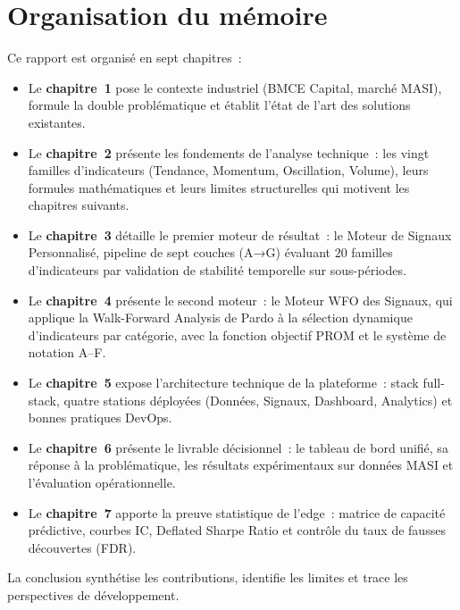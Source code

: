 \section*{Organisation du mémoire}

Ce rapport est organisé en sept chapitres~:

\begin{itemize}
    \item Le \textbf{chapitre~1} pose le contexte industriel (BMCE Capital, marché
    MASI), formule la double problématique et établit l'état de l'art des solutions
    existantes.

    \item Le \textbf{chapitre~2} présente les fondements de l'analyse technique~:
    les vingt familles d'indicateurs (Tendance, Momentum, Oscillation, Volume),
    leurs formules mathématiques et leurs limites structurelles qui motivent
    les chapitres suivants.

    \item Le \textbf{chapitre~3} détaille le premier moteur de résultat~: le
    Moteur de Signaux Personnalisé, pipeline de sept couches (A→G) évaluant
    20 familles d'indicateurs par validation de stabilité temporelle sur sous-périodes.

    \item Le \textbf{chapitre~4} présente le second moteur~: le Moteur WFO des
    Signaux, qui applique la Walk-Forward Analysis de Pardo à la sélection dynamique
    d'indicateurs par catégorie, avec la fonction objectif PROM et le système de
    notation A–F.

    \item Le \textbf{chapitre~5} expose l'architecture technique de la plateforme~:
    stack full-stack, quatre stations déployées (Données, Signaux, Dashboard,
    Analytics) et bonnes pratiques DevOps.

    \item Le \textbf{chapitre~6} présente le livrable décisionnel~: le tableau de
    bord unifié, sa réponse à la problématique, les résultats expérimentaux sur
    données MASI et l'évaluation opérationnelle.

    \item Le \textbf{chapitre~7} apporte la preuve statistique de l'edge~: matrice
    de capacité prédictive, courbes IC, Deflated Sharpe Ratio et contrôle du taux
    de fausses découvertes (FDR).
\end{itemize}

\vspace{0.5cm}
\noindent La conclusion synthétise les contributions, identifie les limites et
trace les perspectives de développement.
